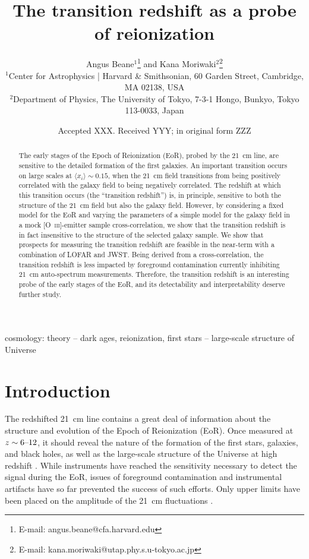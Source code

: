\documentclass[a4paper,fleqn,usenatbib]{mnras}
\title[The transition redshift as an EoR probe]{The transition redshift as a probe of reionization}
\author[A. Beane and K. Moriwaki]{
Angus Beane$^{1}$\thanks{E-mail: angus.beane@cfa.harvard.edu}
and Kana Moriwaki$^{2}$\thanks{E-mail: kana.moriwaki@utap.phy.s.u-tokyo.ac.jp}
\\
$^{1}$Center for Astrophysics {\normalfont |} Harvard \& Smithsonian, 60 Garden Street, Cambridge, MA 02138, USA\\
$^{2}$Department of Physics, The University of Tokyo, 7-3-1 Hongo, Bunkyo, Tokyo 113-0033, Japan
}
\date{Accepted XXX. Received YYY; in original form ZZZ}
\newcommand{\avg}[1]{\ensuremath{\langle #1 \rangle}}
\begin{document}
\label{firstpage}
\pagerange{\pageref{firstpage}--\pageref{lastpage}}
\maketitle

\begin{abstract}
The early stages of the Epoch of Reionization (EoR), probed by the 21~cm line,
are sensitive to the detailed formation of the first galaxies. An important
transition occurs on large scales at $\avg{x_i}\sim0.15$, when the 21~cm field
transitions from being positively correlated with the galaxy field to being
negatively correlated. The redshift at which this transition occurs (the
``transition redshift'') is, in principle, sensitive to both the structure of
the 21~cm field but also the galaxy field. However, by considering a fixed
model for the EoR and varying the parameters of a simple model for the galaxy
field in a mock [O~\textsc{iii}]-emitter sample cross-correlation, we show
that the transition redshift is in fact insensitive to the structure of the
selected galaxy sample. We show that prospects for measuring the transition
redshift are feasible in the near-term with a combination of LOFAR and JWST.
Being derived from a cross-correlation, the transition redshift is less
impacted by foreground contamination currently inhibiting 21~cm auto-spectrum
measurements. Therefore, the transition redshift is an interesting probe of
the early stages of the EoR, and its detectability and interpretability
deserve further study.
\end{abstract}

\begin{keywords}
cosmology: theory -- dark ages, reionization, first stars -- large-scale
structure of Universe
\end{keywords}



\section{Introduction} \label{sec:intro}
The redshifted 21~cm line contains a great deal of information about the
structure and evolution of the Epoch of Reionization (EoR). Once measured at
$z\sim6\textup{--}12$, it should reveal the nature of the formation of the
first stars, galaxies, and black holes, as well as the large-scale structure
of the Universe at high redshift \citep{2013fgu..book.....L}. While
instruments have reached the sensitivity necessary to detect the signal during
the EoR, issues of foreground contamination and instrumental artifacts have so
far prevented the success of such efforts. Only upper limits have been placed
on the amplitude of the 21~cm fluctuations \citep[e.g.][]{2013MNRAS.433..639P,
2014PhRvD..89b3002D, 2016ApJ...833..102B, 2017ApJ...838...65P}.
\end{document}

